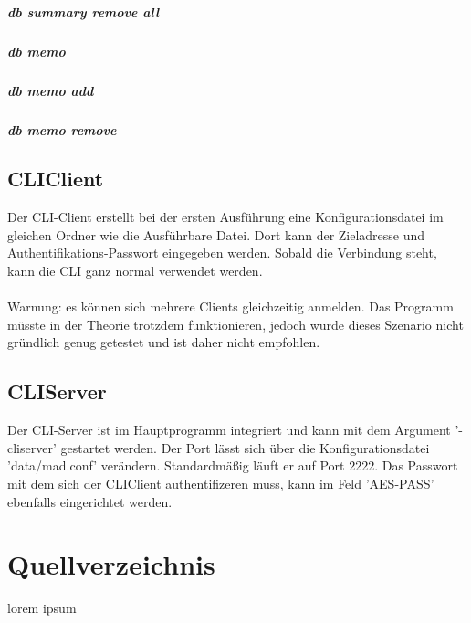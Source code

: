 \documentclass[12pt,a4paper]{report}
\begin{document}
\subsubsection{db summary remove all}

\subsubsection{db memo}

\subsubsection{db memo add}

\subsubsection{db memo remove}

\chapter{CLIClient}

Der CLI-Client erstellt bei der ersten Ausführung eine Konfigurationsdatei im gleichen Ordner wie die Ausführbare Datei. Dort kann der Zieladresse und Authentifikations-Passwort eingegeben werden. Sobald die Verbindung steht, kann die CLI ganz normal verwendet werden.\\\\
Warnung: es können sich mehrere Clients gleichzeitig anmelden. Das Programm müsste in der Theorie trotzdem funktionieren, jedoch wurde dieses Szenario nicht gründlich genug getestet und ist daher nicht empfohlen.

\chapter{CLIServer}

Der CLI-Server ist im Hauptprogramm integriert und kann mit dem Argument '-cliserver' gestartet werden. Der Port lässt sich über die Konfigurationsdatei 'data/mad.conf' verändern. Standardmäßig läuft er auf Port 2222. Das Passwort mit dem sich der CLIClient authentifizeren muss, kann im Feld 'AES-PASS' ebenfalls eingerichtet werden.

\part{Quellverzeichnis}
lorem ipsum
\end{document}
